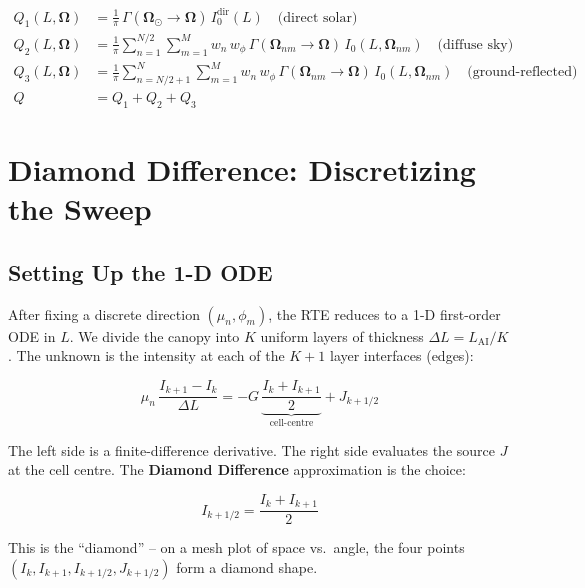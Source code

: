 \documentclass[12pt]{article}
\begin{document}
\begin{align}
  Q_1(L, \boldsymbol{\Omega}) &= \frac{1}{\pi}\,
    \Gamma(\boldsymbol{\Omega}_\odot\!\to\!\boldsymbol{\Omega})\,
    I_0^\mathrm{dir}(L)
    \quad\text{(direct solar)} \\[4pt]
  Q_2(L, \boldsymbol{\Omega}) &= \frac{1}{\pi}
    \sum_{n=1}^{N/2}\sum_{m=1}^{M}
    w_n\,w_\phi\,\Gamma(\boldsymbol{\Omega}_{nm}\!\to\!\boldsymbol{\Omega})\,
    I_0(L,\boldsymbol{\Omega}_{nm})
    \quad\text{(diffuse sky)} \\[4pt]
  Q_3(L, \boldsymbol{\Omega}) &= \frac{1}{\pi}
    \sum_{n=N/2+1}^{N}\sum_{m=1}^{M}
    w_n\,w_\phi\,\Gamma(\boldsymbol{\Omega}_{nm}\!\to\!\boldsymbol{\Omega})\,
    I_0(L,\boldsymbol{\Omega}_{nm})
    \quad\text{(ground-reflected)} \\[4pt]
  Q &= Q_1 + Q_2 + Q_3
\end{align}

\section{Diamond Difference: Discretizing the Sweep}

\subsection{Setting Up the 1-D ODE}

After fixing a discrete direction $(\mu_n, \phi_m)$, the RTE reduces to a
1-D first-order ODE in $L$. We divide the canopy into $K$ uniform layers of
thickness $\Delta L = L_\mathrm{AI}/K$. The unknown is the intensity at each
of the $K+1$ layer interfaces (edges):

\begin{equation}
  \mu_n\,\frac{I_{k+1} - I_k}{\Delta L}
  = -G\,\underbrace{\frac{I_k + I_{k+1}}{2}}_{\text{cell-centre}}
    + J_{k+1/2}
\end{equation}

The left side is a finite-difference derivative. The right side evaluates the
source $J$ at the cell centre. The \textbf{Diamond Difference} approximation
is the choice:

\begin{equation}
  \boxed{I_{k+1/2} = \frac{I_k + I_{k+1}}{2}}
\end{equation}

This is the ``diamond'' -- on a mesh plot of space vs.\ angle, the four points
$(I_k, I_{k+1}, I_{k+1/2}, J_{k+1/2})$ form a diamond shape.
\end{document}
